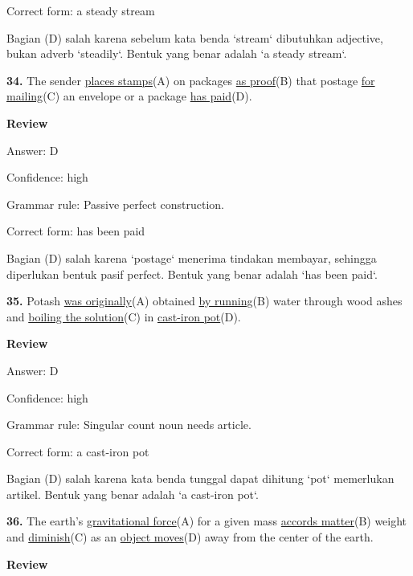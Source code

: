 \documentclass[12pt]{article}
\begin{document}
Correct form: a steady stream\par
Bagian (D) salah karena sebelum kata benda `stream` dibutuhkan adjective, bukan adverb `steadily`. Bentuk yang benar adalah `a steady stream`.\par
\endgroup
\par
\vspace{\questionblockgap}
\noindent\textbf{34.} The sender \uline{places stamps}(A) on packages \uline{as proof}(B) that postage \uline{for mailing}(C) an envelope or a package \uline{has paid}(D).
\par
\begingroup
\setlength{\parskip}{0pt}
\setlength{\parindent}{0pt}
\textbf{Review}\par
Answer: D\par
Confidence: high\par
Grammar rule: Passive perfect construction.\par
Correct form: has been paid\par
Bagian (D) salah karena `postage` menerima tindakan membayar, sehingga diperlukan bentuk pasif perfect. Bentuk yang benar adalah `has been paid`.\par
\endgroup
\par
\vspace{\questionblockgap}
\noindent\textbf{35.} Potash \uline{was originally}(A) obtained \uline{by running}(B) water through wood ashes and \uline{boiling the solution}(C) in \uline{cast-iron pot}(D).
\par
\begingroup
\setlength{\parskip}{0pt}
\setlength{\parindent}{0pt}
\textbf{Review}\par
Answer: D\par
Confidence: high\par
Grammar rule: Singular count noun needs article.\par
Correct form: a cast-iron pot\par
Bagian (D) salah karena kata benda tunggal dapat dihitung `pot` memerlukan artikel. Bentuk yang benar adalah `a cast-iron pot`.\par
\endgroup
\par
\vspace{\questionblockgap}
\noindent\textbf{36.} The earth's \uline{gravitational force}(A) for a given mass \uline{accords matter}(B) weight and \uline{diminish}(C) as an \uline{object moves}(D) away from the center of the earth.
\par
\begingroup
\setlength{\parskip}{0pt}
\setlength{\parindent}{0pt}
\textbf{Review}\par
\end{document}

